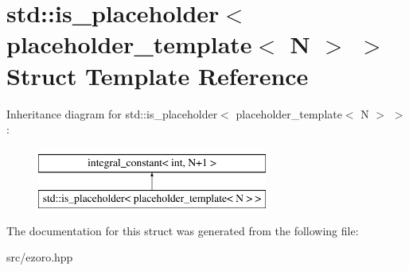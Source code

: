 \hypertarget{structstd_1_1is__placeholder_3_01placeholder__template_3_01_n_01_4_01_4}{\section{std\-:\-:is\-\_\-placeholder$<$ placeholder\-\_\-template$<$ N $>$ $>$ Struct Template Reference}
\label{structstd_1_1is__placeholder_3_01placeholder__template_3_01_n_01_4_01_4}
}
Inheritance diagram for std\-:\-:is\-\_\-placeholder$<$ placeholder\-\_\-template$<$ N $>$ $>$\-:\begin{figure}[H]
\begin{center}
\leavevmode
\includegraphics[height=2.000000cm]{structstd_1_1is__placeholder_3_01placeholder__template_3_01_n_01_4_01_4}
\end{center}
\end{figure}


The documentation for this struct was generated from the following file\-:\begin{DoxyCompactItemize}
\item 
src/ezoro.\-hpp\end{DoxyCompactItemize}

